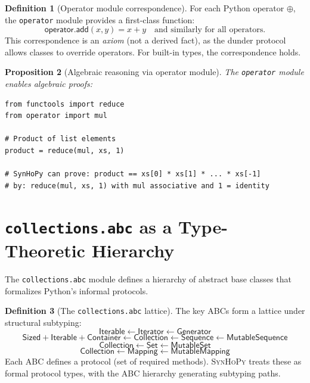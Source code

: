 \documentclass[11pt,a4paper]{report}
\theoremstyle{definition}
\newtheorem{definition}{Definition}[chapter]
\theoremstyle{plain}
\newtheorem{proposition}[definition]{Proposition}
\newcommand{\synhopy}{\textsc{SynHoPy}}
\begin{document}
\begin{definition}[Operator module correspondence]
For each Python operator $\oplus$, the \lstinline[style=python]{operator} module provides
a first-class function:
\[
  \mathsf{operator.add}(x, y) = x + y
  \quad\text{and similarly for all operators.}
\]
This correspondence is an \emph{axiom} (not a derived fact), as the dunder protocol
allows classes to override operators.  For built-in types, the correspondence holds.
\end{definition}

\begin{proposition}[Algebraic reasoning via operator module]
The \lstinline[style=python]{operator} module enables algebraic proofs:
\begin{lstlisting}[style=python]
from functools import reduce
from operator import mul

# Product of list elements
product = reduce(mul, xs, 1)

# SynHoPy can prove: product == xs[0] * xs[1] * ... * xs[-1]
# by: reduce(mul, xs, 1) with mul associative and 1 = identity
\end{lstlisting}
\end{proposition}


\section{\texttt{collections.abc} as a Type-Theoretic Hierarchy}
\label{sec:collections-abc}

The \lstinline[style=python]{collections.abc} module defines a hierarchy of
abstract base classes that formalizes Python's informal protocols.

\begin{definition}[The \texttt{collections.abc} lattice]
The key ABCs form a lattice under structural subtyping:
\[
  \mathsf{Iterable} \leftarrow \mathsf{Iterator} \leftarrow \mathsf{Generator}
\]
\[
  \mathsf{Sized} + \mathsf{Iterable} + \mathsf{Container} \leftarrow \mathsf{Collection}
    \leftarrow \mathsf{Sequence} \leftarrow \mathsf{MutableSequence}
\]
\[
  \mathsf{Collection} \leftarrow \mathsf{Set} \leftarrow \mathsf{MutableSet}
\]
\[
  \mathsf{Collection} \leftarrow \mathsf{Mapping} \leftarrow \mathsf{MutableMapping}
\]
Each ABC defines a protocol (set of required methods).  \synhopy{} treats these as
formal protocol types, with the ABC hierarchy generating subtyping paths.
\end{definition}
\end{document}
